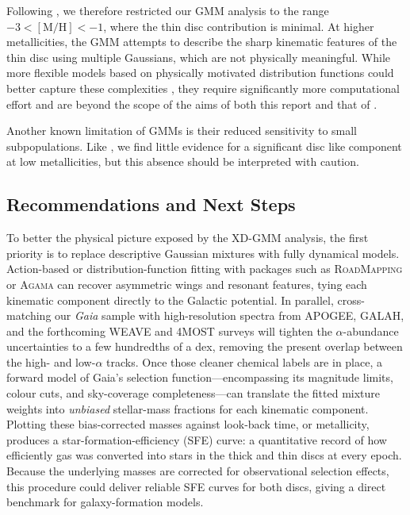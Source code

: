 \documentclass[a4paper,12pt]{article}
\begin{document}
Following \citet{zhang2024existencemetalpoordiscmilky}, we therefore restricted our GMM analysis 
to the range $-3 < \mathrm{[M/H]} < -1$, where the thin disc contribution is minimal. At higher 
metallicities, the GMM attempts to describe the sharp kinematic features of the thin disc using 
multiple Gaussians, which are not physically meaningful. While more flexible models based on 
physically motivated distribution functions could better capture these complexities 
\citep[e.g.][]{Binney2010}, they require significantly more computational effort and are 
beyond the scope of the aims of both this report and that of \citet{zhang2024existencemetalpoordiscmilky}.

Another known limitation of GMMs is their reduced sensitivity to small subpopulations. 
Like \citet{zhang2024existencemetalpoordiscmilky}, we find little evidence for a significant 
disc like component at low metallicities, but this absence should be interpreted with caution. 

\subsection{Recommendations and Next Steps}

To better the physical picture exposed by the XD-GMM analysis, the first priority is to
replace descriptive Gaussian mixtures with fully dynamical models.  
Action-based or distribution-function fitting with packages such as \textsc{RoadMapping} or
\textsc{Agama} can recover asymmetric wings and resonant features, tying each kinematic component
directly to the Galactic potential.  
In parallel, cross-matching our \emph{Gaia} sample with high-resolution spectra from APOGEE, 
GALAH, and the forthcoming WEAVE and 4MOST surveys will tighten the $\alpha$-abundance 
uncertainties to a few hundredths of a dex, removing the present overlap between the high- 
and low-$\alpha$ tracks. Once those cleaner chemical labels are in place, a forward model of 
Gaia's selection function—encompassing its magnitude limits, colour cuts, and 
sky-coverage completeness—can translate the fitted mixture weights into \textit{unbiased} 
stellar-mass fractions for each kinematic component. Plotting these bias-corrected masses 
against look-back time, or metallicity, produces a star-formation-efficiency 
(SFE) curve: a quantitative record of how efficiently gas was converted into stars in the 
thick and thin discs at every epoch. Because the underlying masses are corrected for 
observational selection effects, this procedure could deliver reliable
SFE curves for both discs, giving a direct benchmark for galaxy-formation models.
\end{document}
